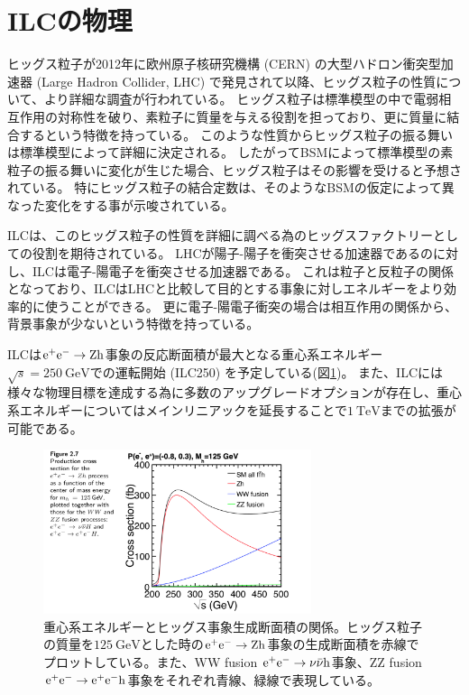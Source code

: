 \section{ILCの物理} \label{Intro:PhysicsofILC}

ヒッグス粒子が2012年に欧州原子核研究機構 (CERN) の大型ハドロン衝突型加速器 (Large Hadron Collider, LHC) で発見されて以降、ヒッグス粒子の性質について、より詳細な調査が行われている。
ヒッグス粒子は標準模型の中で電弱相互作用の対称性を破り、素粒子に質量を与える役割を担っており、更に質量に結合するという特徴を持っている。
このような性質からヒッグス粒子の振る舞いは標準模型によって詳細に決定される。
したがってBSMによって標準模型の素粒子の振る舞いに変化が生じた場合、ヒッグス粒子はその影響を受けると予想されている。
特にヒッグス粒子の結合定数は、そのようなBSMの仮定によって異なった変化をする事が示唆されている。

ILCは、このヒッグス粒子の性質を詳細に調べる為のヒッグスファクトリーとしての役割を期待されている。
LHCが陽子-陽子を衝突させる加速器であるのに対し、ILCは電子-陽電子を衝突させる加速器である。
これは粒子と反粒子の関係となっており、ILCはLHCと比較して目的とする事象に対しエネルギーをより効率的に使うことができる。
更に電子-陽電子衝突の場合は相互作用の関係から、背景事象が少ないという特徴を持っている。

ILCは$\rm e^+e^- \to Zh$事象の反応断面積が最大となる重心系エネルギー$\sqrt{s}=250\ \mathrm{GeV}$での運転開始 (ILC250) を予定している(図\ref{4eetoZH})。
また、ILCには様々な物理目標を達成する為に多数のアップグレードオプションが存在し、重心系エネルギーについてはメインリニアックを延長することで$1\ \mathrm{TeV}$までの拡張が可能である。

\begin{figure}[htbp]
 \centering
 \includegraphics[width=0.7\textwidth]{Figure/1Introduction/4eetoZH.png}
 \caption[重心系エネルギーとヒッグス事象生成断面積の関係]{重心系エネルギーとヒッグス事象生成断面積の関係\cite{ILCTDRVP}。ヒッグス粒子の質量を$125\ \mathrm{GeV}$とした時の$\rm e^+e^- \to Zh$事象の生成断面積を赤線でプロットしている。また、WW fusion $\rm e^+e^- \to \nu \bar{\nu} h$事象、ZZ fusion $\rm e^+e^- \to e^+ e^- h$事象をそれぞれ青線、緑線で表現している。}
 \label{4eetoZH}
\end{figure}

